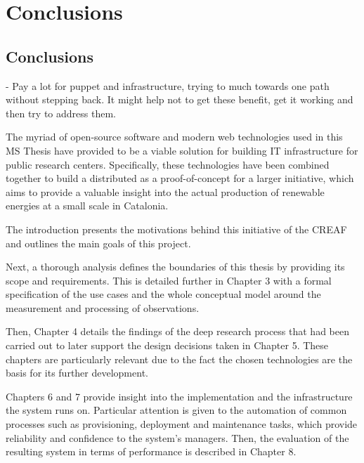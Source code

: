 \chapter{Conclusions}

\section{Conclusions}

- Pay a lot for puppet and infrastructure, trying to much towards one path without stepping back. It might help not to get these benefit, get it working and then try to address them.

The myriad of open-source software and modern web technologies used in this MS Thesis have provided to be a viable solution for building IT infrastructure for public research centers. Specifically, these technologies have been combined together to build a distributed as a proof-of-concept for a larger initiative, which aims to provide a valuable insight into the actual production of renewable energies at a small scale in Catalonia.

The introduction presents the motivations behind this initiative of the CREAF and outlines the main goals of this project.

Next, a thorough analysis defines the boundaries of this thesis by providing its scope and requirements. This is detailed further in Chapter 3 with a formal specification of the use cases and the whole conceptual model around the measurement and processing of observations.

Then, Chapter 4 details the findings of the deep research process that had been carried out 
to later support the design decisions taken in Chapter 5. These chapters are particularly relevant due to the fact the chosen technologies are the basis for its further development.

Chapters 6 and 7 provide insight into the implementation and the infrastructure the system runs on. Particular attention is given to the automation of common processes such as provisioning, deployment and maintenance tasks, which provide reliability and confidence to the system's managers. Then, the evaluation of the resulting system in terms of performance is described in Chapter 8.

